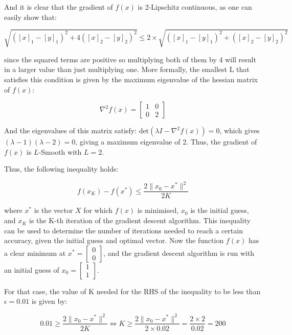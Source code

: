 \documentclass[12pt]{report} %
\begin{document}
And it is clear that the gradient of $f(x)$ is 2-Lipschitz continuous, as one can easily show that:

\begin{equation}
    \sqrt{([x]_1 - [y]_1)^2 + 4([x]_2 - [y]_2)^2} \leq 2 \times \sqrt{([x]_1 - [y]_1)^2 + ([x]_2 - [y]_2)^2}
\end{equation}

since the squared terms are positive so multiplying both of them by 4 will result in a larger value than just multiplying one. More formally, the smallest L that satisfies this condition is given by the maximum eigenvalue of the hessian matrix of $f(x)$\cite[claim 5]{lecture12}:

\begin{equation}
    \nabla^2 f(x) = \begin{bmatrix} 1 & 0 \\ 0 & 2 \end{bmatrix}
\end{equation}

And the eigenvalues of this matrix satisfy: $\text{det}(\lambda I - \nabla^2 f(x)) = 0$, which gives $(\lambda - 1)(\lambda - 2) = 0$, giving a maximum eigenvalue of 2. Thus, the gradient of $f(x)$ is $L$-Smooth with $L = 2$.

Thus, the following inequality holds:

\begin{equation}
    f(x_K) - f(x^*) \leq \frac{2 \|x_0 - x^*\|^2}{2K}
\end{equation}

where $x^*$ is the vector $X$ for which $f(x)$ is minimised, $x_0$ is the initial guess, and $x_K$ is the K-th iteration of the gradient descent algorithm. This inequality can be used to determine the number of iterations needed to reach a certain accuracy, given the initial guess and optimal vector. Now the function $f(x)$ has a clear minimum at $x^* = \begin{bmatrix} 0 \\ 0 \end{bmatrix}$, and the gradient descent algorithm is run with an initial guess of $x_0 = \begin{bmatrix} 1 \\ 1 \end{bmatrix}$.

For that case, the value of K needed for the RHS of the inequality to be less than $\epsilon = 0.01$ is given by:

\begin{equation}
    0.01 \geq \frac{2 \|x_0 - x^*\|^2}{2K} \iff K \geq \frac{2 \|x_0 - x^*\|^2}{2\times 0.02} = \frac{2 \times 2}{0.02} = 200
\end{equation}
\end{document}
